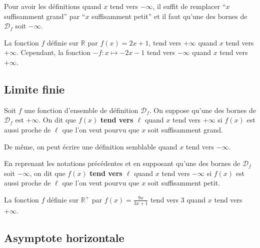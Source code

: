 	\begin{tip}
		Pour avoir les définitions quand $x$ tend vers $-\infty$, il suffit de remplacer ``$x$ suffisamment grand'' par ``$x$ suffisamment petit'' et il faut qu'une des bornes de $\mathcal{D}_f$ soit $-\infty$.
	\end{tip}
	
	\begin{tip}[Exemple]
		La fonction $f$ définie sur $\mathbb{R}$ par $f(x) = 2x+1$, tend vers $+\infty$ quand $x$ tend vers $+\infty$. Cependant, la fonction $-f : x \mapsto -2x - 1$ tend vers $-\infty$ quand $x$ tend vers $+\infty$.
	\end{tip}
	
	\subsection{Limite finie}
	
	\begin{formula}
		Soit $f$ une fonction d'ensemble de définition $\mathcal{D}_f$. On suppose qu'une des bornes de $\mathcal{D}_f$ est $+\infty$.
		\newpar
		On dit que $f(x)$ \textbf{tend vers $\ell$} quand $x$ tend vers $+\infty$ si $f(x)$ est aussi proche de $\ell$ que l'on veut pourvu que $x$ soit suffisamment grand.
	\end{formula}
	
	De même, on peut écrire une définition semblable quand $x$ tend vers $-\infty$.
	
	\begin{tip}
		En reprenant les notations précédentes et en supposant qu'une des bornes de $\mathcal{D}_f$ soit $-\infty$, on dit que $f(x)$ \textbf{tend vers $\ell$} quand $x$ tend vers $-\infty$ si $f(x)$ est aussi proche de $\ell$ que l'on veut pourvu que $x$ soit suffisamment petit.
	\end{tip}
	
	\begin{tip}[Exemple]
		La fonction $f$ définie sur $\mathbb{R}^+$ par $f(x) = \frac{9x}{3x+1}$ tend vers $3$ quand $x$ tend vers $+\infty$.
	\end{tip}
	
	\subsection{Asymptote horizontale}
	
